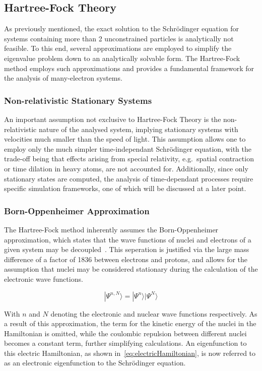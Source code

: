 \documentclass[11pt]{article}
\begin{document}
\bigskip

\subsection{Hartree-Fock Theory}
As previously mentioned, the exact solution to the Schrödinger equation for systems containing more than 2 unconstrained particles is analytically not feasible.
To this end, several approximations are employed to simplify the eigenvalue problem down to an analytically solvable form.
The Hartree-Fock method employs such approximations and provides a fundamental framework for the analysis of many-electron systems.

\subsubsection{Non-relativistic Stationary Systems}
An important assumption not exclusive to Hartree-Fock Theory is the non-relativistic nature of the analysed system, 
implying stationary systems with velocities much smaller than the speed of light.
This assumption allows one to employ only the much simpler time-independant Schrödinger equation, with the trade-off being that effects arising from special relativity, e.g.~spatial contraction or time dilation in heavy atoms, are not accounted for.
Additionally, since only stationary states are computed, the analysis of time-dependant processes require specific simulation frameworks, one of which will be discussed at a later point.

\subsubsection{Born-Oppenheimer Approximation}
The Hartree-Fock method inherently assumes the Born-Oppenheimer approximation, which states that the wave functions of nuclei and electrons of a given system may be decoupled~\cite{Born1927}.
This seperation is justified via the large mass difference of a factor of 1836 between electrons and protons, and allows for the assumption that nuclei may be considered stationary during the calculation of the electronic wave functions.

\begin{equation}
  |\Psi^{n, N}\rangle = |\Psi^{n}\rangle|\Psi^{N}\rangle 
\end{equation}

\bigskip

\noindent With $n$ and $N$ denoting the electronic and nuclear wave functions respectively. As a result of this approximation,
the term for the kinetic energy of the nuclei in the Hamiltonian is omitted, while the coulombic repulsion between different nuclei becomes a constant term, further simplifying calculations.
An eigenfunction to this electric Hamiltonian, as shown in~\ref{eq:electricHamiltonian},  is now referred to as an electronic eigenfunction to the Schrödinger equation.
\end{document}
